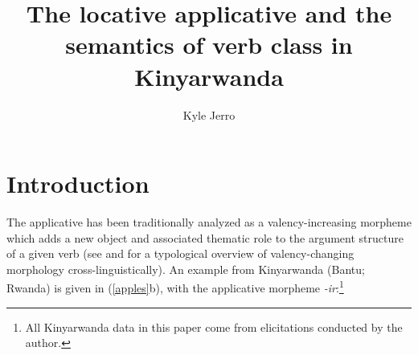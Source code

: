 \documentclass[output=paper]{langsci/langscibook}
\title{The locative applicative and the semantics of verb class in Kinyarwanda}
\author{%
 Kyle Jerro \affiliation{University of Texas at Austin } 
}
\begin{document}
\renewcommand{\comment}{\bf\color{blue}}
\newcommand{\p}{\leavevmode\llap{(}}
\newcommand{\odd}{\leavevmode\llap{\#}}
\newcommand{\odder}{\leavevmode\llap{?\#}}
\newcommand{\q}{\leavevmode\llap{?}}
\newcommand{\hm}{\footnotesize\leavevmode\llap{?(?)}}
\newcommand{\qq}{\leavevmode\llap{??}}
\newcommand{\bad}{\leavevmode\llap{*}}
\newcommand{\huh}{\leavevmode\llap{?*}}

\def\emdash{\hbox{~--\ }}
\def\endash{\hbox{--}}




 
 
 



 
\section{Introduction}%

 The applicative has been traditionally analyzed as a valency-increasing morpheme which adds a new object and associated thematic role to the argument structure of a given verb (see \citealt{dixon:1997} and \citealt{peterson:2007} for a typological overview of valency-changing morphology cross-linguistically). An example from Kinyarwanda (Bantu; Rwanda) is given in (\ref{apples}b), with the applicative morpheme \emph{-ir}:\footnote{All Kinyarwanda data in this paper come from elicitations conducted by the author.}
\end{document}
